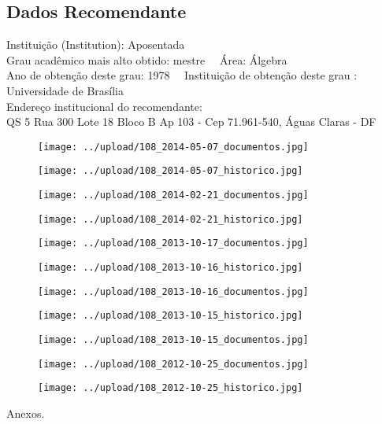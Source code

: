 \documentclass[11pt]{article}
\begin{document}
\subsection*{Dados Recomendante} 
	Instituição (Institution): Aposentada
\\ 
	Grau acadêmico mais alto obtido: mestre
	\ \ Área: Álgebra
	\\
	Ano de obtenção deste grau: 1978
	\ \ 
	Instituição de obtenção deste grau : Universidade de Brasília
	\\ 
	Endereço institucional do recomendante: \\ QS 5 Rua 300 Lote 18 Bloco B Ap 103 - Cep 71.961-540, Águas Claras - DF	
\begin{figure}[!htb]
\texttt{[image: ../upload/108\_2014-05-07\_documentos.jpg]}
\end{figure}	
\begin{figure}[!htb]
\texttt{[image: ../upload/108\_2014-05-07\_historico.jpg]}
\end{figure}	
\begin{figure}[!htb]
\texttt{[image: ../upload/108\_2014-02-21\_documentos.jpg]}
\end{figure}	
\begin{figure}[!htb]
\texttt{[image: ../upload/108\_2014-02-21\_historico.jpg]}
\end{figure}	
\begin{figure}[!htb]
\texttt{[image: ../upload/108\_2013-10-17\_documentos.jpg]}
\end{figure}	
\begin{figure}[!htb]
\texttt{[image: ../upload/108\_2013-10-16\_historico.jpg]}
\end{figure}	
\begin{figure}[!htb]
\texttt{[image: ../upload/108\_2013-10-16\_documentos.jpg]}
\end{figure}	
\begin{figure}[!htb]
\texttt{[image: ../upload/108\_2013-10-15\_historico.jpg]}
\end{figure}	
\begin{figure}[!htb]
\texttt{[image: ../upload/108\_2013-10-15\_documentos.jpg]}
\end{figure}	
\begin{figure}[!htb]
\texttt{[image: ../upload/108\_2012-10-25\_documentos.jpg]}
\end{figure}	
\begin{figure}[!htb]
\texttt{[image: ../upload/108\_2012-10-25\_historico.jpg]}
\end{figure} 
\begin{center}
Anexos.
\end{center}
\end{document}
